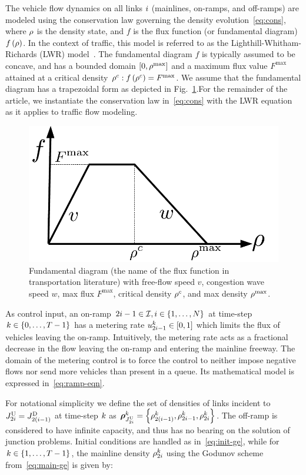 The vehicle flow dynamics on all links $i$ (mainlines, on-ramps,
and off-ramps) are modeled using the conservation law governing the
density evolution~\eqref{eq:cons}, where $\rho$ is the
density state, and $f$ is the flux function (or fundamental diagram)
$f\left(\rho\right)$. In the context of traffic, this model is
referred to as the Lighthill-Whitham-Richards (LWR) model~\cite{lighthill1955kinematic,richards1956shock}.
The fundamental diagram $f$ is typically assumed to be concave, and
has a bounded domain $\left[0,\rho^{\max}\right]$ and a maximum
flux value $F^{\max}$ attained at a critical density $\rho^{c}:f\left(\rho^{c}\right)=F^{\max}$.
We assume that the fundamental diagram has a trapezoidal form as depicted
in Fig.~\ref{fig:Fundamental-diagram-with}.For the remainder of the article, we instantiate the conservation law in~\eqref{eq:cons}
with the LWR equation as it applies to traffic flow modeling.\begin{figure}%
\begin{centering}
\includegraphics[width=0.4\columnwidth]{figs-gen/fd}
\par\end{centering}

\caption{Fundamental diagram (the name of the flux function in transportation
literature) with free-flow speed $v$, congestion wave speed $w$,
max flux $F^{\max}$, critical density $\rho^{c}$, and max density
$\rho^{\max}$.\label{fig:Fundamental-diagram-with}}
			\end{figure}%


As control input, an on-ramp $2i-1\in\mathcal{I},i\in\left\{ 1,\ldots,N\right\}$
at time-step $k\in\left\{ 0,\ldots,T-1\right\}$ has a metering rate $u_{2i-1}^{k}\in\left[0,1\right]$
which limits the flux of vehicles leaving the on-ramp. Intuitively,
the metering rate acts as a fractional decrease in the flow leaving
the on-ramp and entering the mainline freeway. The domain of the metering
control is to force the control to neither impose negative flows nor
send more vehicles than present in a queue. Its mathematical model
is expressed in~\eqref{eq:ramp-eqn}.

For notational simplicity we define the set of densities of links
incident to $J_{2i}^{\text{U}}=J_{2\left(i-1\right)}^{\text{D}}$ at time-step
$k$ as $\juncstate{\jup{2\link}}{\tind}=\left\{ \discrete{2\left(\link-1\right)}{\tind},\discrete{2i-1}{\tind},\discrete{2\link}{\tind}\right\} $.
The off-ramp is considered to have infinite capacity, and thus has
no bearing on the solution of junction problems. Initial conditions
are handled as in~\eqref{eq:init-ge}, while for $k\in\left\{ 1,\ldots,T-1\right\}$,
the mainline density $\rho_{2i}^{k}$ using the Godunov
scheme from~\eqref{eq:main-ge} is given by:

